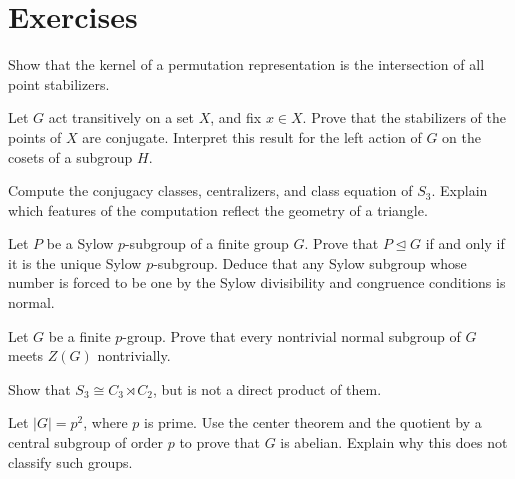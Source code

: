\section*{Exercises}
\begin{exercise}[Basic]
Show that the kernel of a permutation representation is the intersection of
all point stabilizers.
\end{exercise}
\begin{exercise}[Core]
Let \(G\) act transitively on a set \(X\), and fix \(x\in X\).  Prove that
the stabilizers of the points of \(X\) are conjugate.  Interpret this result
for the left action of \(G\) on the cosets of a subgroup \(H\).
\end{exercise}
\begin{exercise}[Core]
Compute the conjugacy classes, centralizers, and class equation of \(S_3\).
Explain which features of the computation reflect the geometry of a triangle.
\end{exercise}
\begin{exercise}[Core]
Let \(P\) be a Sylow \(p\)-subgroup of a finite group \(G\).  Prove that
\(P\trianglelefteq G\) if and only if it is the unique Sylow \(p\)-subgroup.
Deduce that any Sylow subgroup whose number is forced to be one by the Sylow
divisibility and congruence conditions is normal.
\end{exercise}
\begin{exercise}[Core]
Let \(G\) be a finite \(p\)-group.  Prove that every nontrivial normal
subgroup of \(G\) meets \(Z(G)\) nontrivially.
\end{exercise}
\begin{exercise}[Further]
Show that \(S_3\cong C_3\rtimes C_2\), but is not a direct product of them.
\end{exercise}
\begin{exercise}
Let \(|G|=p^2\), where \(p\) is prime.  Use the center theorem and the
quotient by a central subgroup of order \(p\) to prove that \(G\) is abelian.
Explain why this does not classify such groups.
\end{exercise}
